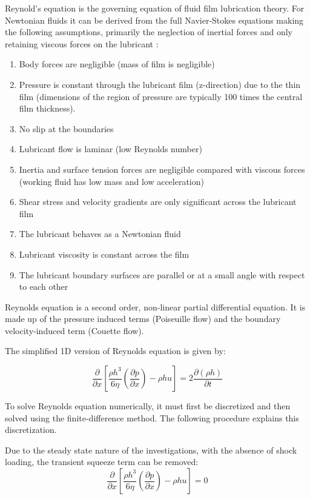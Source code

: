 Reynold’s equation \cite{Reynolds1886} is the governing equation of fluid film lubrication theory. For Newtonian fluids it can be derived from the full Navier-Stokes equations making the following assumptions, primarily the neglection of inertial forces and only retaining viscous forces on the lubricant \cite{Gohar1988}:
\begin{enumerate} %
	\item Body forces are negligible (mass of film is negligible)
	\item Pressure is constant through the lubricant film (z-direction) due to the thin film (dimensions of the region of pressure are typically 100 times the central film thickness).
	\item No slip at the boundaries
	\item Lubricant flow is laminar (low Reynolds number)
	\item Inertia and surface tension forces are negligible compared with viscous forces (working fluid has low mass and low acceleration)
	\item Shear stress and velocity gradients are only significant across the lubricant film
	\item The lubricant behaves as a Newtonian fluid
	\item Lubricant viscosity is constant across the film
	\item The lubricant boundary surfaces are parallel or at a small angle with respect to each other
\end{enumerate}

Reynolds equation is a second order, non-linear partial differential equation. It is made up of the pressure induced terms (Poiseuille flow) and the boundary velocity-induced term (Couette flow). 

The simplified 1D version of Reynolds equation is given by:

\begin{equation}\label{eq3.1}
	\frac{\partial}{\partial x}\left[\frac{\rho h^{3}}{6 \eta}\left(\frac{\partial p}{\partial x}\right)-\rho h u\right]=2 \frac{\partial(\rho h)}{\partial t}
\end{equation}

To solve Reynolds equation numerically, it must first be discretized and then solved using the finite-difference method. The following procedure explains this discretization.

Due to the steady state nature of the investigations, with the absence of shock loading, the transient squeeze term can be removed:
\begin{equation}\label{eq3.2}
	\frac{\partial}{\partial x}\left[\frac{\rho h^{3}}{6 \eta}\left(\frac{\partial p}{\partial x}\right)-\rho h u\right]=0
\end{equation}

